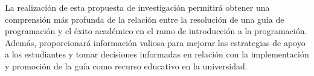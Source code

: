 La realización de esta propuesta de investigación permitirá obtener una comprensión más profunda de la relación entre la resolución de una guía de programación y el éxito académico en el ramo de introducción a la programación. Además, proporcionará información valiosa para mejorar las estrategias de apoyo a los estudiantes y tomar decisiones informadas en relación con la implementación y promoción de la guía como recurso educativo en la universidad.